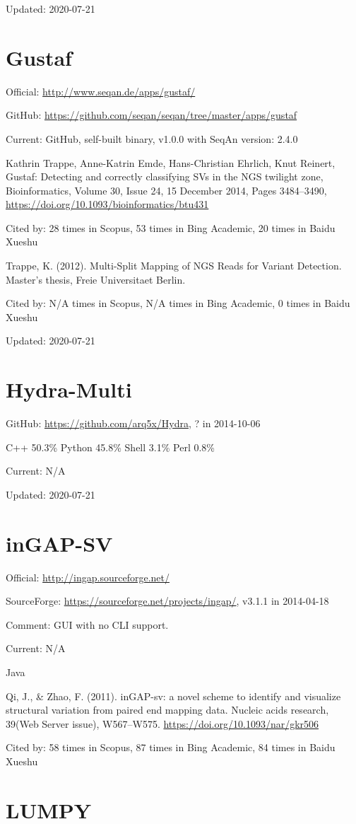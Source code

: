 \documentclass[]{article}
\newcommand{\cb}[3]{\par Cited by: {\color{blue}\Huge #1} times in Scopus, {\color{blue}\Huge #2} times in Bing Academic, {\color{blue}\Huge #3} times in Baidu Xueshu}
\begin{document}
Updated: 2020-07-21

\section{Gustaf}

Official: \url{http://www.seqan.de/apps/gustaf/}

GitHub: \url{https://github.com/seqan/seqan/tree/master/apps/gustaf}

Current: GitHub, self-built binary, v1.0.0 with SeqAn version: 2.4.0

Kathrin Trappe, Anne-Katrin Emde, Hans-Christian Ehrlich, Knut Reinert, Gustaf: Detecting and correctly classifying SVs in the NGS twilight zone, Bioinformatics, Volume 30, Issue 24, 15 December 2014, Pages 3484–3490, \url{https://doi.org/10.1093/bioinformatics/btu431}\cb{28}{53}{20}

Trappe, K. (2012). Multi-Split Mapping of NGS Reads for Variant Detection. Master’s thesis, Freie Universitaet Berlin.\cb{N/A}{N/A}{0}

Updated: 2020-07-21

\section{Hydra-Multi}

GitHub: \url{https://github.com/arq5x/Hydra}, ? in 2014-10-06

C++ 50.3\% Python 45.8\% Shell 3.1\% Perl 0.8\%

Current: N/A

Updated: 2020-07-21

\section{inGAP-SV}

Official: \url{http://ingap.sourceforge.net/}

SourceForge: \url{https://sourceforge.net/projects/ingap/}, v3.1.1 in 2014-04-18

Comment: GUI with no CLI support.

Current: N/A

Java

Qi, J., \& Zhao, F. (2011). inGAP-sv: a novel scheme to identify and visualize structural variation from paired end mapping data. Nucleic acids research, 39(Web Server issue), W567–W575. \url{https://doi.org/10.1093/nar/gkr506}\cb{58}{87}{84}

\section{LUMPY}
\end{document}
